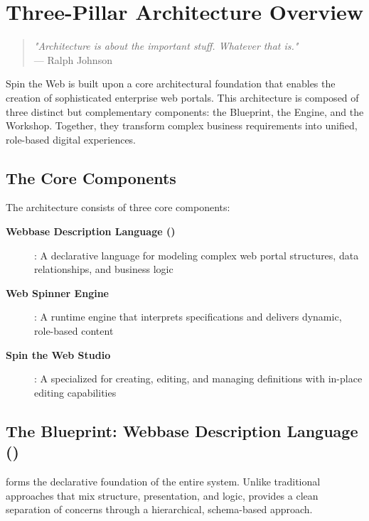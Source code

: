 
\chapter{Three-Pillar Architecture Overview}
\label{chap:architecture}

\begin{quote}
\textit{"Architecture is about the important stuff. Whatever that is."} \\
— Ralph Johnson
\end{quote}

Spin the Web is built upon a core architectural foundation that enables the creation of sophisticated enterprise web portals. This architecture is composed of three distinct but complementary components: the Blueprint, the Engine, and the Workshop. Together, they transform complex business requirements into unified, role-based digital experiences.

\section{The Core Components}
\label{sec:core-components}

The architecture consists of three core components:

\begin{description}
\item[\textbf{Webbase Description Language (\wbdl{})}]: A declarative language for modeling complex web portal structures, data relationships, and business logic
\item[\textbf{Web Spinner Engine}]: A runtime engine that interprets \wbdl{} specifications and delivers dynamic, role-based content
\item[\textbf{Spin the Web Studio}]: A specialized \webbaselet{} for creating, editing, and managing \webbase{} definitions with in-place editing capabilities
\end{description}

\section{The Blueprint: Webbase Description Language (\wbdl{})}
\label{sec:blueprint-wbdl}

\wbdl{} forms the declarative foundation of the entire system. Unlike traditional approaches that mix structure, presentation, and logic, \wbdl{} provides a clean separation of concerns through a hierarchical, schema-based approach.

